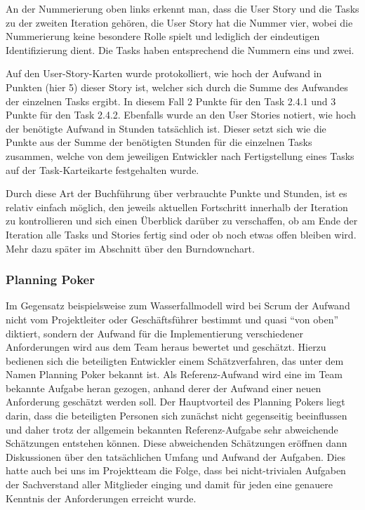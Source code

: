 \noindent
An der Nummerierung oben links erkennt man, dass die User Story und die Tasks zu der zweiten Iteration gehören, die User Story
hat die Nummer vier, wobei die Nummerierung keine besondere Rolle spielt und lediglich der eindeutigen Identifizierung dient.  Die Tasks haben entsprechend die Nummern eins und zwei. 

Auf den User-Story-Karten wurde protokolliert, wie hoch der Aufwand in Punkten (hier 5) dieser Story ist, welcher sich durch die Summe des Aufwandes der einzelnen Tasks ergibt. In diesem Fall 2 Punkte für den Task 2.4.1 und 3 Punkte für den Task 2.4.2. 
Ebenfalls wurde an den User Stories notiert, wie hoch der benötigte Aufwand in Stunden tatsächlich ist. Dieser setzt sich wie die Punkte aus der Summe der benötigten Stunden für die einzelnen Tasks zusammen, welche von dem jeweiligen Entwickler nach Fertigstellung eines Tasks auf der Task-Karteikarte festgehalten wurde.

Durch diese Art der Buchführung über verbrauchte Punkte und Stunden, ist es relativ einfach möglich, den jeweils aktuellen Fortschritt innerhalb der Iteration zu kontrollieren und sich einen Überblick darüber zu verschaffen, ob am Ende der Iteration alle Tasks und Stories fertig sind oder ob noch etwas offen bleiben wird. Mehr dazu später im Abschnitt über den Burndownchart.

\subsubsection{Planning Poker}
Im Gegensatz beispielsweise zum Wasserfallmodell wird bei Scrum der Aufwand nicht vom Projektleiter oder Geschäftsführer bestimmt und quasi "`von oben"' diktiert, sondern der Aufwand für die Implementierung verschiedener Anforderungen wird aus dem Team heraus bewertet und geschätzt. Hierzu bedienen sich die beteiligten Entwickler einem Schätzverfahren, das unter dem Namen Planning Poker bekannt ist. Als Referenz-Aufwand wird eine im Team bekannte Aufgabe heran gezogen, anhand derer der Aufwand einer neuen Anforderung geschätzt werden soll. Der Hauptvorteil des Planning Pokers liegt darin, dass die beteiligten Personen sich zunächst nicht gegenseitig beeinflussen und daher trotz der allgemein bekannten Referenz-Aufgabe sehr abweichende Schätzungen entstehen können. 
Diese abweichenden Schätzungen eröffnen dann Diskussionen über den tatsächlichen Umfang und Aufwand der Aufgaben. Dies hatte auch bei uns im Projektteam die Folge, dass bei nicht-trivialen Aufgaben der Sachverstand aller Mitglieder einging und damit für jeden eine genauere Kenntnis der Anforderungen erreicht wurde.


